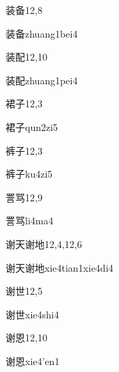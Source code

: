 \begin{entry}{装备}{12,8}
  \begin{phonetics}{装备}{zhuang1bei4}
  \end{phonetics}
\end{entry}

\begin{entry}{装配}{12,10}
  \begin{phonetics}{装配}{zhuang1pei4}
  \end{phonetics}
\end{entry}

\begin{entry}{裙子}{12,3}
  \begin{phonetics}{裙子}{qun2zi5}
  \end{phonetics}
\end{entry}

\begin{entry}{裤子}{12,3}
  \begin{phonetics}{裤子}{ku4zi5}
  \end{phonetics}
\end{entry}

\begin{entry}{詈骂}{12,9}
  \begin{phonetics}{詈骂}{li4ma4}
  \end{phonetics}
\end{entry}

\begin{entry}{谢天谢地}{12,4,12,6}
  \begin{phonetics}{谢天谢地}{xie4tian1xie4di4}
  \end{phonetics}
\end{entry}

\begin{entry}{谢世}{12,5}
  \begin{phonetics}{谢世}{xie4shi4}
  \end{phonetics}
\end{entry}

\begin{entry}{谢恩}{12,10}
  \begin{phonetics}{谢恩}{xie4'en1}
  \end{phonetics}
\end{entry}

